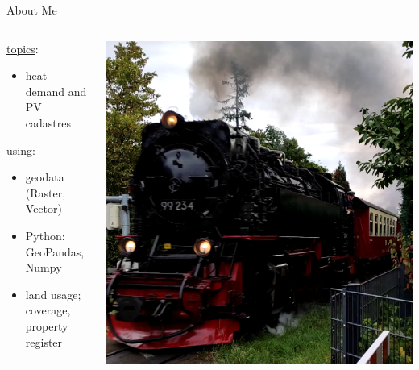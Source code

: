 

\begin{frame}{About Me}
	\begin{columns}
		
		\begin{column}{0.55\textwidth}
			\begin{tcolorbox}[enhanced jigsaw, colback=white, opacityback=.4,  colframe=ElixirPurple, arc=3mm, boxrule=0mm, height=0.8\textheight, valign=center, title=Working Live]
				
				\underline{topics}:
				\begin{itemize}
					\item heat demand and PV cadastres
				\end{itemize}
				\underline{using}:
				\begin{itemize}
					\item geodata (Raster, Vector)
					\item Python: GeoPandas, Numpy
					\item land usage; coverage, property register
				\end{itemize}
				
			\end{tcolorbox}
		\end{column}
		
		\begin{column}{0.55\textwidth}
			\begin{tcolorbox}[enhanced jigsaw, colback=white, opacityback=.4, colframe=ElixirPurple, arc=3mm, boxrule=0mm, height=0.8\textheight, valign=center, title=Privat Live]
				\includegraphics[height=\tcbtextheight,   keepaspectratio]{pictures/vlcsnap-2024-01-31-23h37m06s479.png}
			\end{tcolorbox}
		\end{column}
		
	\end{columns}
\end{frame}